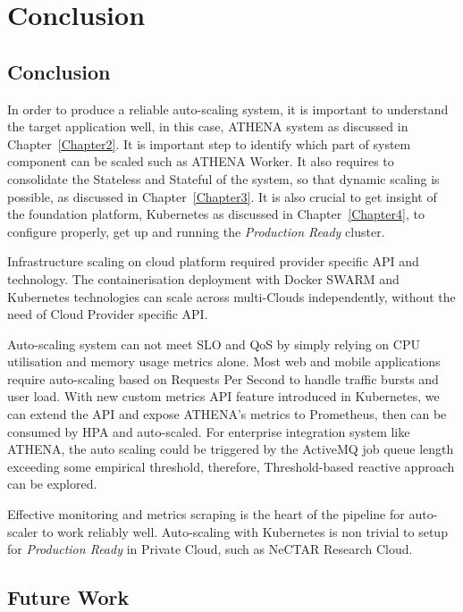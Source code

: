 \chapter{Conclusion}

\label{Chapter6}

\section{Conclusion}

In order to produce a reliable auto-scaling system, it is important to understand the target application well, in this case, ATHENA system as discussed in Chapter~\ref{Chapter2}. It is important step to identify which part of system component can be scaled such as ATHENA Worker. It also requires to consolidate the Stateless and Stateful of the system, so that dynamic scaling is possible, as discussed in Chapter~\ref{Chapter3}. It is also crucial to get insight of the foundation platform, Kubernetes as discussed in Chapter~\ref{Chapter4}, to configure properly, get up and running the \emph{Production Ready} cluster. 

Infrastructure scaling on cloud platform required provider specific API and technology. The containerisation deployment with Docker SWARM and Kubernetes technologies can scale across multi-Clouds independently, without the need of Cloud Provider specific API.

Auto-scaling system can not meet SLO and QoS by simply relying on CPU utilisation and memory usage metrics alone. Most web and mobile applications require auto-scaling based on Requests Per Second to handle traffic bursts and user load. With new custom metrics API feature introduced in Kubernetes, we can extend the API and expose ATHENA's metrics to Prometheus, then can be consumed by HPA and auto-scaled. For enterprise integration system like ATHENA, the auto scaling could be triggered by the ActiveMQ job queue length exceeding some empirical threshold, therefore, Threshold-based reactive approach can be explored.

Effective monitoring and metrics scraping is the heart of the pipeline for auto-scaler to work reliably well. Auto-scaling with Kubernetes is non trivial to setup for \emph{Production Ready} in Private Cloud, such as NeCTAR Research Cloud.


\section{Future Work}

